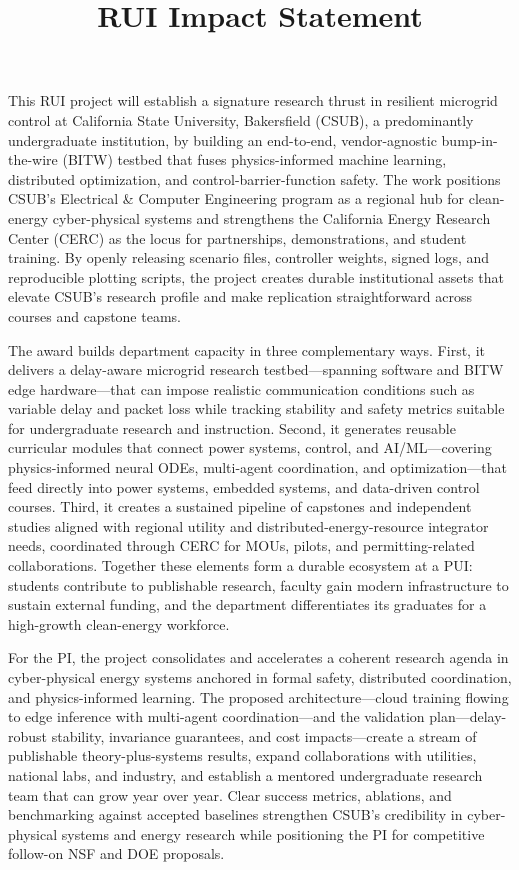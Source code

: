 \documentclass[12pt]{article}
\begin{document}
\title{RUI Impact Statement}
\author{}
\date{}
\maketitle

This RUI project will establish a signature research thrust in resilient microgrid control at California State University, Bakersfield (CSUB), a predominantly undergraduate institution, by building an end-to-end, vendor-agnostic bump-in-the-wire (BITW) testbed that fuses physics-informed machine learning, distributed optimization, and control-barrier-function safety. The work positions CSUB's Electrical \& Computer Engineering program as a regional hub for clean-energy cyber-physical systems and strengthens the California Energy Research Center (CERC) as the locus for partnerships, demonstrations, and student training. By openly releasing scenario files, controller weights, signed logs, and reproducible plotting scripts, the project creates durable institutional assets that elevate CSUB's research profile and make replication straightforward across courses and capstone teams.

The award builds department capacity in three complementary ways. First, it delivers a delay-aware microgrid research testbed—spanning software and BITW edge hardware—that can impose realistic communication conditions such as variable delay and packet loss while tracking stability and safety metrics suitable for undergraduate research and instruction. Second, it generates reusable curricular modules that connect power systems, control, and AI/ML—covering physics-informed neural ODEs, multi-agent coordination, and optimization—that feed directly into power systems, embedded systems, and data-driven control courses. Third, it creates a sustained pipeline of capstones and independent studies aligned with regional utility and distributed-energy-resource integrator needs, coordinated through CERC for MOUs, pilots, and permitting-related collaborations. Together these elements form a durable ecosystem at a PUI: students contribute to publishable research, faculty gain modern infrastructure to sustain external funding, and the department differentiates its graduates for a high-growth clean-energy workforce.

For the PI, the project consolidates and accelerates a coherent research agenda in cyber-physical energy systems anchored in formal safety, distributed coordination, and physics-informed learning. The proposed architecture—cloud training flowing to edge inference with multi-agent coordination—and the validation plan—delay-robust stability, invariance guarantees, and cost impacts—create a stream of publishable theory-plus-systems results, expand collaborations with utilities, national labs, and industry, and establish a mentored undergraduate research team that can grow year over year. Clear success metrics, ablations, and benchmarking against accepted baselines strengthen CSUB's credibility in cyber-physical systems and energy research while positioning the PI for competitive follow-on NSF and DOE proposals.
\end{document}
